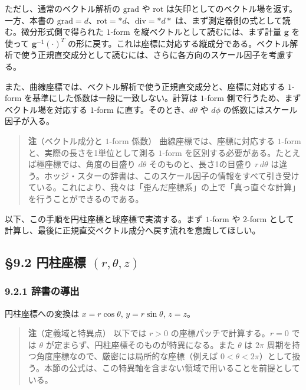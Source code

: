 \documentclass[a4paper,12pt,openany]{book}
\begin{document}
ただし、通常のベクトル解析の \(\mathrm{grad}\) や \(\mathrm{rot}\)
は矢印としてのベクトル場を返す。一方、本書の
\(\mathrm{grad}=d\)、\(\mathrm{rot}=\ast d\)、\(\mathrm{div}=\ast d\ast\)
は、まず測定器側の式として読む。微分形式側で得られた \(1\)-form
を縦ベクトルとして読むには、まず計量 \(\mathbf{g}\) を使って
\(\mathbf{g}^{-1}(\cdot)^T\)
の形に戻す。これは座標に対応する縦成分である。ベクトル解析で使う正規直交成分として読むには、さらに各方向のスケール因子を考慮する。

また、曲線座標では、ベクトル解析で使う正規直交成分と、座標に対応する
\(1\)-form を基準にした係数は一般に一致しない。計算は \(1\)-form
側で行うため、まずベクトル場を対応する \(1\)-form
に直す。そのとき、\(d\theta\) や \(d\phi\)
の係数にはスケール因子が入る。

\begin{quote}
\textbf{注}（ベクトル成分と \(1\)-form 係数）
曲線座標では、座標に対応する \(1\)-form と、実際の長さを1単位として測る
\(1\)-form を区別する必要がある。たとえば極座標では、角度の目盛り
\(d\theta\) そのものと、長さ1の目盛り \(r\,d\theta\)
は違う。ホッジ・スターの辞書は、このスケール因子の情報をすべて引き受けている。これにより、我々は「歪んだ座標系」の上で「真っ直ぐな計算」を行うことができるのである。
\end{quote}

以下、この手順を円柱座標と球座標で実演する。まず \(1\)-form や
\(2\)-form
として計算し、最後に正規直交ベクトル成分へ戻す流れを意識してほしい。

\par\vspace{0.35em}\par

\hypertarget{ux5186ux67f1ux5ea7ux6a19-rthetaz}{%
\subsection{\texorpdfstring{§9.2 円柱座標
\((r,\theta,z)\)}{§9.2 円柱座標 (r,\textbackslash theta,z)}}\label{ux5186ux67f1ux5ea7ux6a19-rthetaz}}

\hypertarget{ux8f9eux66f8ux306eux5c0eux51fa}{%
\subsubsection{9.2.1 辞書の導出}\label{ux8f9eux66f8ux306eux5c0eux51fa}}

円柱座標への変換は \(x = r\cos\theta\), \(y = r\sin\theta\), \(z = z\)。

\begin{quote}
\textbf{注}（定義域と特異点） 以下では \(r > 0\)
の座標パッチで計算する。\(r = 0\) では \(\theta\)
が定まらず、円柱座標そのものが特異になる。また \(\theta\) は \(2\pi\)
周期を持つ角度座標なので、厳密には局所的な座標（例えば
\(0 < \theta < 2\pi\)）として扱う。本節の公式は、この特異軸を含まない領域で用いることを前提としている。
\end{quote}
\end{document}
